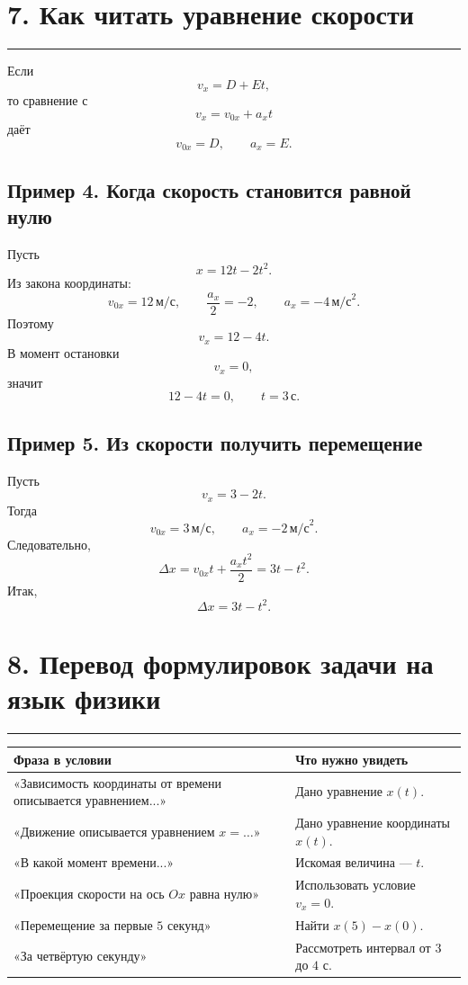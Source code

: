 \documentclass[a4paper,12pt]{article}
\newcommand{\sectionline}{%
  \vspace{0.1em}
  \noindent\textcolor{accent}{\rule{\linewidth}{0.5pt}}
  \vspace{0.45em}
}
\newcommand{\ms}{\,\text{м/с}}
\newcommand{\mss}{\,\text{м/с}^{2}}
\newcommand{\second}{\,\text{с}}
\begin{document}
\section*{7. Как читать уравнение скорости}
\sectionline

Если
\[
  v_x=D+Et,
\]
то сравнение с
\[
  v_x=v_{0x}+a_xt
\]
даёт
\[
\boxed{v_{0x}=D,\qquad a_x=E.}
\]

\subsection*{Пример 4. Когда скорость становится равной нулю}

Пусть
\[
  x=12t-2t^2.
\]
Из закона координаты:
\[
  v_{0x}=12\ms,
  \qquad
  \frac{a_x}{2}=-2,
  \qquad
  a_x=-4\mss.
\]
Поэтому
\[
  v_x=12-4t.
\]
В момент остановки
\[
  v_x=0,
\]
значит
\[
  12-4t=0,
  \qquad
  \boxed{t=3\second.}
\]

\subsection*{Пример 5. Из скорости получить перемещение}

Пусть
\[
  v_x=3-2t.
\]
Тогда
\[
  v_{0x}=3\ms,
  \qquad
  a_x=-2\mss.
\]
Следовательно,
\[
  \Delta x=v_{0x}t+\frac{a_xt^2}{2}
  =3t-t^2.
\]
Итак,
\[
  \boxed{\Delta x=3t-t^2.}
\]

\section*{8. Перевод формулировок задачи на язык физики}
\sectionline

\renewcommand{\arraystretch}{1.3}
\begin{table}[ht]
\centering
\begin{tabularx}{\linewidth}{@{}>{\raggedright\arraybackslash}X>{\raggedright\arraybackslash}X@{}}
\toprule
\textbf{Фраза в условии} & \textbf{Что нужно увидеть} \\
\midrule
«Зависимость координаты от времени описывается уравнением...»
& Дано уравнение $x(t)$. \\
«Движение описывается уравнением $x=\ldots$»
& Дано уравнение координаты $x(t)$. \\
«В какой момент времени...»
& Искомая величина --- $t$. \\
«Проекция скорости на ось $Ox$ равна нулю»
& Использовать условие $v_x=0$. \\
«Перемещение за первые $5$ секунд»
& Найти $x(5)-x(0)$. \\
«За четвёртую секунду»
& Рассмотреть интервал от $3$ до $4$ с. \\
\bottomrule
\end{tabularx}
\end{table}
\end{document}
